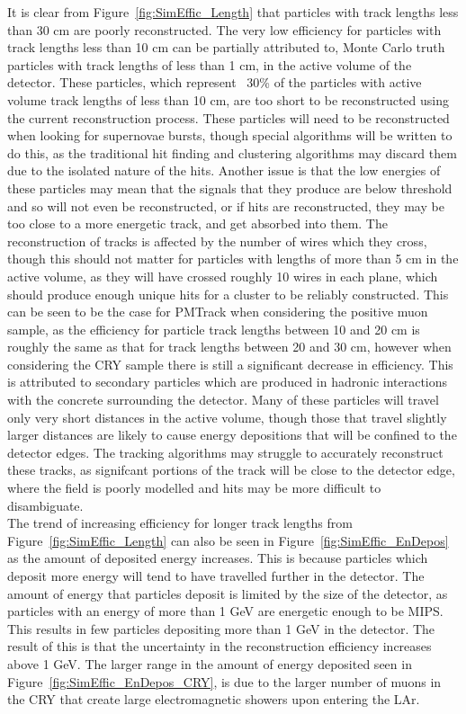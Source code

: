 It is clear from Figure~\ref{fig:SimEffic_Length} that particles with track lengths less than 30 cm are poorly reconstructed. The very low efficiency for particles with track lengths less than 10 cm can be partially attributed to, Monte Carlo truth particles with track lengths of less than 1 cm, in the active volume of the detector. These particles, which represent ~30\% of the particles with active volume track lengths of less than 10 cm, are too short to be reconstructed using the current reconstruction process. These particles will need to be reconstructed when looking for supernovae bursts, though special algorithms will be written to do this, as the traditional hit finding and clustering algorithms may discard them due to the isolated nature of the hits. Another issue is that the low energies of these particles may mean that the signals that they produce are below threshold and so will not even be reconstructed, or if hits are reconstructed, they may be too close to a more energetic track, and get absorbed into them. The reconstruction of tracks is affected by the number of wires which they cross, though this should not matter for particles with lengths of more than 5 cm in the active volume, as they will have crossed roughly 10 wires in each plane, which should produce enough unique hits for a cluster to be reliably constructed. This can be seen to be the case for PMTrack when considering the positive muon sample, as the efficiency for particle track lengths between 10 and 20 cm is roughly the same as that for track lengths between 20 and 30 cm, however when considering the CRY sample there is still a significant decrease in efficiency. This is attributed to secondary particles which are produced in hadronic interactions with the concrete surrounding the detector. Many of these particles will travel only very short distances in the active volume, though those that travel slightly larger distances are likely to cause energy depositions that will be confined to the detector edges. The tracking algorithms may struggle to accurately reconstruct these tracks, as signifcant portions of the track will be close to the detector edge, where the field is poorly modelled and hits may be more difficult to disambiguate. \\

The trend of increasing efficiency for longer track lengths from Figure~\ref{fig:SimEffic_Length} can also be seen in Figure~\ref{fig:SimEffic_EnDepos} as the amount of deposited energy increases. This is because particles which deposit more energy will tend to have travelled further in the detector. The amount of energy that particles deposit is limited by the size of the detector, as particles with an energy of more than 1 GeV are energetic enough to be MIPS. This results in few particles depositing more than 1 GeV in the detector. The result of this is that the uncertainty in the reconstruction efficiency increases above 1 GeV. The larger range in the amount of energy deposited seen in Figure~\ref{fig:SimEffic_EnDepos_CRY}, is due to the larger number of muons in the CRY that create large electromagnetic showers upon entering the LAr. \\


